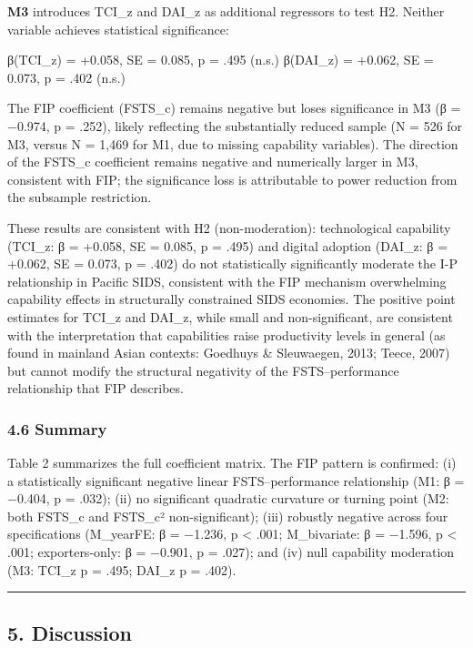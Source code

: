 \documentclass[12pt,a4paper]{article}
\begin{document}
\textbf{M3} introduces TCI\_z and DAI\_z as additional regressors to
test H2. Neither variable achieves statistical significance:

β(TCI\_z) = +0.058, SE = 0.085, p = .495 (n.s.) β(DAI\_z) = +0.062, SE =
0.073, p = .402 (n.s.)

The FIP coefficient (FSTS\_c) remains negative but loses significance in
M3 (β = −0.974, p = .252), likely reflecting the substantially reduced
sample (N = 526 for M3, versus N = 1,469 for M1, due to missing
capability variables). The direction of the FSTS\_c coefficient remains
negative and numerically larger in M3, consistent with FIP; the
significance loss is attributable to power reduction from the subsample
restriction.

These results are consistent with H2 (non-moderation): technological
capability (TCI\_z: β = +0.058, SE = 0.085, p = .495) and digital
adoption (DAI\_z: β = +0.062, SE = 0.073, p = .402) do not statistically
significantly moderate the I-P relationship in Pacific SIDS, consistent
with the FIP mechanism overwhelming capability effects in structurally
constrained SIDS economies. The positive point estimates for TCI\_z and
DAI\_z, while small and non-significant, are consistent with the
interpretation that capabilities raise productivity levels in general
(as found in mainland Asian contexts: Goedhuys \& Sleuwaegen, 2013;
Teece, 2007) but cannot modify the structural negativity of the
FSTS--performance relationship that FIP describes.

\hypertarget{46-summary}{%
\subsubsection{4.6 Summary}\label{46-summary}}

Table 2 summarizes the full coefficient matrix. The FIP pattern is
confirmed: (i) a statistically significant negative linear
FSTS--performance relationship (M1: β = −0.404, p = .032); (ii) no
significant quadratic curvature or turning point (M2: both FSTS\_c and
FSTS\_c² non-significant); (iii) robustly negative across four
specifications (M\_yearFE: β = −1.236, p \textless{} .001; M\_bivariate:
β = −1.596, p \textless{} .001; exporters-only: β = −0.901, p = .027);
and (iv) null capability moderation (M3: TCI\_z p = .495; DAI\_z p =
.402).

\begin{center}\rule{0.5\linewidth}{0.5pt}\end{center}

\hypertarget{5-discussion}{%
\subsection{5. Discussion}\label{5-discussion}}
\end{document}
